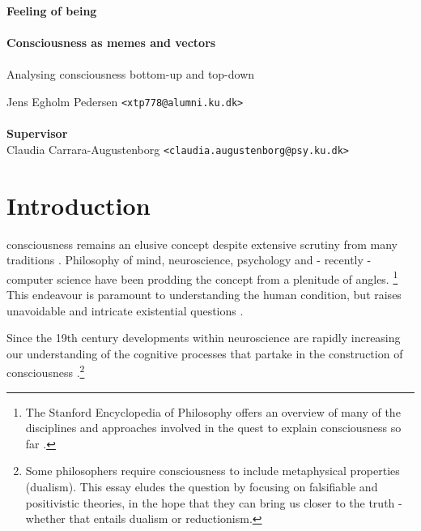 \documentclass[a4paper,oneside]{memoir}
\begin{document}
    \thispagestyle{empty}
    \begin{adjustwidth}{-3cm}{-1.5cm}
    \vspace*{-1cm}
    \textbf{\Huge Feeling of being} \\
    \vspace*{2.5cm} \\
    \textbf{\Huge Consciousness as memes and vectors} \\
    \vspace*{.1cm} \\
    {\huge Analysing consciousness bottom-up and top-down} \\
    \begin{tabbing}
    Jens Egholm Pedersen \hspace{1cm} \= \texttt{<xtp778@alumni.ku.dk>} \\
    \\[11cm]

    \textbf{\Large Supervisor} \\
    Claudia Carrara-Augustenborg \hspace{1cm} \texttt{<claudia.augustenborg@psy.ku.dk>} \\
    \end{tabbing}
    \end{adjustwidth}
    \newpage
    \ClearWallPaper

\section{Introduction}
\Gls{consciousness} remains an elusive concept despite extensive scrutiny
from many traditions \autocite{sep-consciousness}. Philosophy of mind,
neuroscience, psychology and - recently - computer science have been
prodding the concept from a plenitude of angles.
\footnote{The Stanford Encyclopedia of Philosophy offers an overview of
many of the disciplines and approaches involved in the quest to explain
\gls{consciousness} so far \autocite{sep-consciousness}.}
This endeavour is paramount to understanding the human condition, but
raises unavoidable and intricate existential questions
\autocite{amodei2016, soares2016}.


Since the 19th century developments within neuroscience are rapidly
increasing our understanding of the cognitive processes that partake in
the construction of \gls{consciousness} \autocite{atkinson2000}.\footnote{
Some philosophers require consciousness
to include metaphysical properties \autocite{sep-consciousness} (dualism).
This essay eludes the question by
focusing on falsifiable and positivistic theories, in the hope that
they can bring us closer to the truth - whether that entails dualism
or reductionism.}
\end{document}
